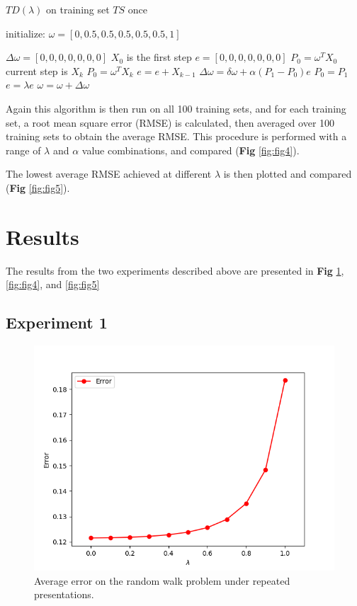 \documentclass[10pt]{article}
\begin{document}
\begin{algorithm}
\caption{$TD(\lambda)$ on training set $TS$ once}
\begin{algorithmic}
\STATE initialize: $\omega=[0,0.5,0.5,0.5,0.5,0.5,1]$

\STATE $\Delta\omega=[0,0,0,0,0,0,0]$
\STATE $X_0$ is the first step
\STATE $e=[0,0,0,0,0,0,0]$
\STATE $P_0=\omega^T X_0$
\STATE current step is $X_k$
\STATE $P_0=\omega^T X_k$
\STATE $e=e+X_{k-1}$
\STATE $\Delta\omega=\delta\omega+\alpha (P_1-P_0)e$
\STATE $P_0=P_1$
\STATE $e=\lambda e$
\ENDFOR
\STATE $\omega=\omega+\Delta\omega$
\ENDFOR


\end{algorithmic}
\end{algorithm}

Again this algorithm is then run on all 100 training sets, and for each training set, a root mean square error (RMSE) is calculated, then averaged over 100 training sets to obtain the average RMSE. This procedure is performed with a range of $\lambda$ and $\alpha$ value combinations, and compared (\textbf{Fig} \ref{fig:fig4}).\par

The lowest average RMSE achieved at different $\lambda$ is then plotted and compared (\textbf{Fig} \ref{fig:fig5}).




\section{Results} \label{results}

The results from the two experiments described above are presented in \textbf{Fig} \ref{fig:fig3}, \ref{fig:fig4}, and \ref{fig:fig5}



\subsection{Experiment 1} \label{results1}

\begin{figure}[h!]
  \centering
  \includegraphics[width=0.6\linewidth]{../results/experiment1.png}
      \caption{Average error on the random walk problem under repeated presentations.}
  \label{fig:fig3}
\end{figure}
\end{document}
